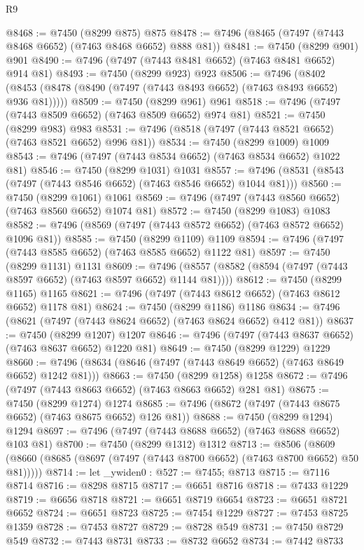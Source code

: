 \begin{lexlean}{R9}
\begin{coremodule}
@8468 := @7450 (@8299 @875) @875
@8478 := @7496 (@8465 (@7497 (@7443 @8468 @6652) (@7463 @8468 @6652) @888 @81))
@8481 := @7450 (@8299 @901) @901
@8490 := @7496 (@7497 (@7443 @8481 @6652) (@7463 @8481 @6652) @914 @81)
@8493 := @7450 (@8299 @923) @923
@8506 := @7496
    (@8402 (@8453 (@8478 (@8490 (@7497 (@7443 @8493 @6652) (@7463 @8493 @6652) @936 @81)))))
@8509 := @7450 (@8299 @961) @961
@8518 := @7496 (@7497 (@7443 @8509 @6652) (@7463 @8509 @6652) @974 @81)
@8521 := @7450 (@8299 @983) @983
@8531 := @7496 (@8518 (@7497 (@7443 @8521 @6652) (@7463 @8521 @6652) @996 @81))
@8534 := @7450 (@8299 @1009) @1009
@8543 := @7496 (@7497 (@7443 @8534 @6652) (@7463 @8534 @6652) @1022 @81)
@8546 := @7450 (@8299 @1031) @1031
@8557 := @7496 (@8531 (@8543 (@7497 (@7443 @8546 @6652) (@7463 @8546 @6652) @1044 @81)))
@8560 := @7450 (@8299 @1061) @1061
@8569 := @7496 (@7497 (@7443 @8560 @6652) (@7463 @8560 @6652) @1074 @81)
@8572 := @7450 (@8299 @1083) @1083
@8582 := @7496 (@8569 (@7497 (@7443 @8572 @6652) (@7463 @8572 @6652) @1096 @81))
@8585 := @7450 (@8299 @1109) @1109
@8594 := @7496 (@7497 (@7443 @8585 @6652) (@7463 @8585 @6652) @1122 @81)
@8597 := @7450 (@8299 @1131) @1131
@8609 := @7496 (@8557 (@8582 (@8594 (@7497 (@7443 @8597 @6652) (@7463 @8597 @6652) @1144 @81))))
@8612 := @7450 (@8299 @1165) @1165
@8621 := @7496 (@7497 (@7443 @8612 @6652) (@7463 @8612 @6652) @1178 @81)
@8624 := @7450 (@8299 @1186) @1186
@8634 := @7496 (@8621 (@7497 (@7443 @8624 @6652) (@7463 @8624 @6652) @412 @81))
@8637 := @7450 (@8299 @1207) @1207
@8646 := @7496 (@7497 (@7443 @8637 @6652) (@7463 @8637 @6652) @1220 @81)
@8649 := @7450 (@8299 @1229) @1229
@8660 := @7496 (@8634 (@8646 (@7497 (@7443 @8649 @6652) (@7463 @8649 @6652) @1242 @81)))
@8663 := @7450 (@8299 @1258) @1258
@8672 := @7496 (@7497 (@7443 @8663 @6652) (@7463 @8663 @6652) @281 @81)
@8675 := @7450 (@8299 @1274) @1274
@8685 := @7496 (@8672 (@7497 (@7443 @8675 @6652) (@7463 @8675 @6652) @126 @81))
@8688 := @7450 (@8299 @1294) @1294
@8697 := @7496 (@7497 (@7443 @8688 @6652) (@7463 @8688 @6652) @103 @81)
@8700 := @7450 (@8299 @1312) @1312
@8713 := @8506
    (@8609 (@8660 (@8685 (@8697 (@7497 (@7443 @8700 @6652) (@7463 @8700 @6652) @50 @81)))))
@8714 := let _ywiden0 : @527 := @7455; @8713
@8715 := @7116 @8714
@8716 := @8298 @8715
@8717 := @6651 @8716
@8718 := @7433 @1229
@8719 := @6656 @8718
@8721 := @6651 @8719 @6654
@8723 := @6651 @8721 @6652
@8724 := @6651 @8723
@8725 := @7454 @1229
@8727 := @7453 @8725 @1359
@8728 := @7453 @8727
@8729 := @8728 @549
@8731 := @7450 @8729 @549
@8732 := @7443 @8731
@8733 := @8732 @6652
@8734 := @7442 @8733

\end{coremodule}
\end{lexlean}
